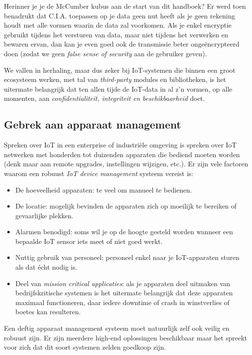 \documentclass[
  10pt,
  dutch,
  paper=a4,
  ,captions=tableheading
]{scrbook}
\providecommand{\tightlist}{%
  \setlength{\itemsep}{0pt}\setlength{\parskip}{0pt}}
\begin{document}
Herinner je je de McCumber kubus aan de start van dit handboek? Er werd
toen benadrukt dat C.I.A. toepassen op je data geen nut heeft als je
geen rekening houdt met alle vormen waarin de data zal voorkomen. Als je
enkel encryptie gebruikt tijdens het versturen van data, maar niet
tijdens het verwerken en bewaren ervan, dan kan je even goed ook de
transmissie beter ongeëncrypteerd doen (zodat we geen \emph{false sense
of security} aan de gebruiker geven).

We vallen in herhaling, maar dus zeker bij IoT-systemen die binnen een
groot ecosysteem werken, met tal van \emph{third-party} modules en
bibliotheken, is het uitermate belangrijk dat ten allen tijde de
IoT-data in al z'n vormen, op alle momenten, aan
\emph{confidentialiteit, integriteit en beschikbaarheid} doet.

\subsection{Gebrek aan apparaat
management}\label{gebrek-aan-apparaat-management}

Spreken over IoT in een enterprise of industriële omgeving is spreken
over IoT netwerken met honderden tot duizenden apparaten die bediend
moeten worden (denk maar aan remote upgrades, instellingen wijzigen,
etc.). Er zijn vele factoren waarom een robuust \emph{IoT device
management} systeem vereist is:

\begin{itemize}
\tightlist
\item
  De hoeveelheid apparaten: te veel om manueel te bedienen.
\item
  De locatie: mogelijk bevinden de apparaten zich op moeilijk te
  bereiken of gevaarlijke plekken.
\item
  Alarmen benodigd: soms wil je op de hoogte gesteld worden wanneer een
  bepaalde IoT sensor iets meet of niet goed werkt.
\item
  Nuttig gebruik van personeel: personeel enkel naar je IoT-apparaten
  sturen als dat écht nodig is.
\item
  Deel van \emph{mission critical applicaties}: als je apparaten deel
  uitmaken van bedrijfskritische systemen is het uitermate belangrijk
  dat deze apparaten maximaal functioneren, daar iedere downtime of
  crash in winstverlies of boetes kan resulteren.
\end{itemize}

Een deftig apparaat management systeem moet natuurlijk zelf ook veilig
en robuust zijn. Er zijn meerdere high-end oplossingen beschikbaar maar
het spreekt voor zich dat dit soort systemen zelden goedkoop zijn.
\end{document}
